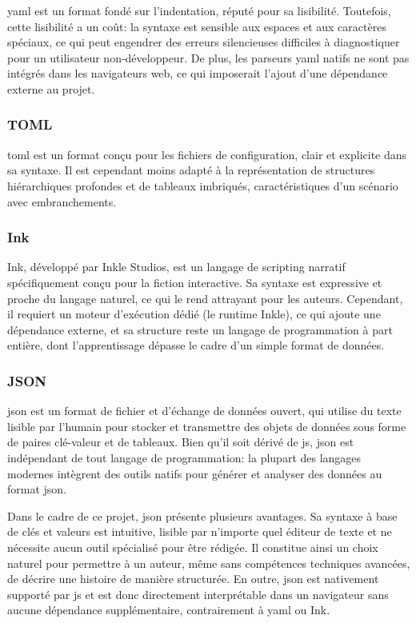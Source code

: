 \gls{yaml} est un format fondé sur l'indentation, réputé pour sa lisibilité. Toutefois, cette lisibilité a un coût: la \gls{syntaxe} est sensible aux espaces et aux caractères spéciaux, ce qui peut engendrer des erreurs silencieuses difficiles à diagnostiquer pour un utilisateur non-développeur. De plus, les \glspl{parseur} \gls{yaml} natifs ne sont pas intégrés dans les navigateurs web, ce qui imposerait l'ajout d'une dépendance externe au projet. \parencite{noauthor_-_nodate}


\subsubsection{TOML}

\gls{toml} est un format conçu pour les fichiers de configuration, clair et explicite dans sa \gls{syntaxe}. Il est cependant moins adapté à la représentation de structures hiérarchiques profondes et de tableaux imbriqués, caractéristiques d'un scénario avec embranchements. \parencite{noauthor_toml_nodate}


\subsubsection{Ink}

Ink, développé par Inkle Studios, est un langage de scripting narratif spécifiquement conçu pour la fiction interactive. Sa \gls{syntaxe} est expressive et proche du langage naturel, ce qui le rend attrayant pour les auteurs. Cependant, il requiert un moteur d'exécution dédié (le runtime Inkle), ce qui ajoute une dépendance externe, et sa structure reste un langage de programmation à part entière, dont l'apprentissage dépasse le cadre d'un simple format de données. \parencite{noauthor_ink_nodate}


\subsubsection{JSON}

\gls{json} est un format de fichier et d'échange de données ouvert, qui utilise du texte lisible par l'humain pour stocker et transmettre des objets de données sous forme de paires clé-valeur et de tableaux. Bien qu'il soit dérivé de \gls{js}, \gls{json} est indépendant de tout langage de programmation: la plupart des langages modernes intègrent des outils natifs pour générer et analyser des données au format \gls{json}. \parencite{noauthor_what_nodate}

Dans le cadre de ce projet, \gls{json} présente plusieurs avantages. Sa \gls{syntaxe} à base de clés et valeurs est intuitive, lisible par n'importe quel éditeur de texte et ne nécessite aucun outil spécialisé pour être rédigée. Il constitue ainsi un choix naturel pour permettre à un auteur, même sans compétences techniques avancées, de décrire une histoire de manière structurée. En outre, \gls{json} est nativement supporté par \gls{js} et est donc directement interprétable dans un navigateur sans aucune dépendance supplémentaire, contrairement à \gls{yaml} ou Ink.


